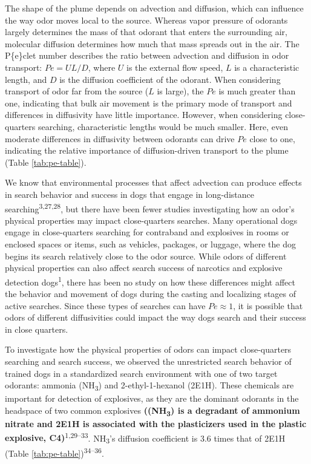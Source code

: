 \documentclass[
]{article}
\begin{document}
The shape of the plume depends on advection and diffusion, which can influence the way odor moves local to the source. Whereas vapor pressure of odorants largely determines the mass of that odorant that enters the surrounding air, molecular diffusion determines how much that mass spreads out in the air. The P\textquotesingle\{e\}clet number describes the ratio between advection and diffusion in odor transport: \(Pe = UL/D\), where \(U\) is the external flow speed, \(L\) is a characteristic length, and \(D\) is the diffusion coefficient of the odorant. When considering transport of odor far from the source (\(L\) is large), the \(Pe\) is much greater than one, indicating that bulk air movement is the primary mode of transport and differences in diffusivity have little importance. However, when considering close-quarters searching, characteristic lengths would be much smaller. Here, even moderate differences in diffusivity between odorants can drive \(Pe\) close to one, indicating the relative importance of diffusion-driven transport to the plume (Table \ref{tab:pe-table}).

We know that environmental processes that affect advection can produce effects in search behavior and success in dogs that engage in long-distance searching\textsuperscript{3,27,28}, but there have been fewer studies investigating how an odor's physical properties may impact close-quarters searches. Many operational dogs engage in close-quarters searching for contraband and explosives in rooms or enclosed spaces or items, such as vehicles, packages, or luggage, where the dog begins its search relatively close to the odor source. While odors of different physical properties can also affect search success of narcotics and explosive detection dogs\textsuperscript{1}, there has been no study on how these differences might affect the behavior and movement of dogs during the casting and localizing stages of active searches. Since these types of searches can have \(Pe \approx 1\), it is possible that odors of different diffusivities could impact the way dogs search and their success in close quarters.

To investigate how the physical properties of odors can impact close-quarters searching and search success, we observed the unrestricted search behavior of trained dogs in a standardized search environment with one of two target odorants: ammonia (NH\textsubscript{3}) and 2-ethyl-1-hexanol (2E1H). These chemicals are important for detection of explosives, as they are the dominant odorants in the headspace of two common explosives \textbf{((NH\textsubscript{3}) is a degradant of ammonium nitrate and 2E1H is associated with the plasticizers used in the plastic explosive, C4)}\textsuperscript{1,29--33}. NH\textsubscript{3}'s diffusion coefficient is 3.6 times that of 2E1H (Table \ref{tab:pe-table})\textsuperscript{34--36}.
\end{document}
